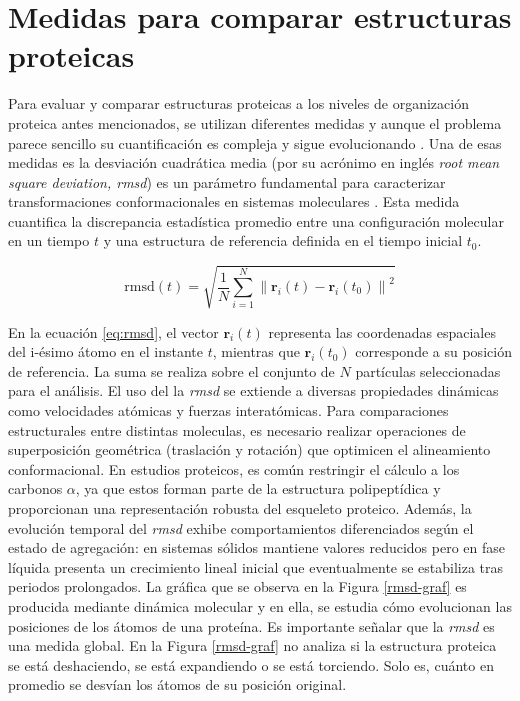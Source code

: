 \section{Medidas para comparar estructuras proteicas}
\label{sec:rmsd}

Para evaluar y comparar estructuras proteicas a los niveles de organización proteica antes mencionados, se utilizan diferentes medidas y aunque el problema parece sencillo su cuantiﬁcaci\'{o}n es compleja y sigue evolucionando \cite{Kufareva2012}. Una de esas medidas es la desviaci\'{o}n cuadr\'{a}tica media (por su acrónimo en inglés \textit{root mean square deviation, rmsd}) es un par\'{a}metro fundamental para caracterizar transformaciones conformacionales en sistemas moleculares \cite{Santamaria2023}. Esta medida cuantifica la discrepancia estad\'{i}stica promedio entre una configuraci\'{o}n molecular en un tiempo $t$ y una estructura de referencia definida en el tiempo inicial $t_0$.

\begin{equation}
	\text{rmsd}(t) = \sqrt{ \frac{1}{N} \sum_{i=1}^{N} \left\| \mathbf{r}_i(t) - \mathbf{r}_i(t_0) \right\|^2 }
	\label{eq:rmsd}
\end{equation}

En la ecuaci\'{o}n \ref{eq:rmsd}, el vector \(\mathbf{r}_i(t)\) representa las coordenadas espaciales del i-\'{e}simo \'{a}tomo en el instante $t$, mientras que \(\mathbf{r}_i(t_0)\) corresponde a su posici\'{o}n de referencia. La suma se realiza sobre el conjunto de $N$ part\'{i}culas seleccionadas para el an\'{a}lisis. El uso del la \textit{rmsd} se extiende a diversas propiedades din\'{a}micas como velocidades at\'{o}micas y fuerzas interat\'{o}micas. Para comparaciones estructurales entre distintas moleculas, es necesario realizar operaciones de superposici\'{o}n geom\'{e}trica (traslaci\'{o}n y rotaci\'{o}n) que optimicen el alineamiento conformacional. En estudios proteicos, es com\'{u}n restringir el c\'{a}lculo a los carbonos $\alpha$, ya que estos forman parte de la estructura polipept\'{i}dica y proporcionan una representaci\'{o}n robusta del esqueleto proteico. Además, la evoluci\'{o}n temporal del \textit{rmsd} exhibe comportamientos diferenciados seg\'{u}n el estado de agregaci\'{o}n: en sistemas s\'{o}lidos mantiene valores reducidos pero en fase l\'{i}quida presenta un crecimiento lineal inicial que eventualmente se estabiliza tras periodos prolongados. La gr\'{a}ﬁca que se observa en la Figura \ref{rmsd-graf} es producida mediante din\'{a}mica molecular y en ella, se estudia c\'{o}mo evolucionan las posiciones de los \'{a}tomos de una prote\'{i}na. Es importante señalar que la \textit{rmsd} es una medida  global. En la Figura \ref{rmsd-graf} no analiza si la estructura proteica se est\'{a} deshaciendo, se est\'{a} expandiendo o se est\'{a} torciendo. Solo es, cu\'{a}nto en promedio se desv\'{i}an los \'{a}tomos de su posici\'{o}n original.

